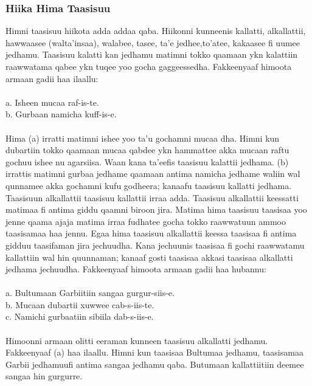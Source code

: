 \documentclass[11pt,b5paper]{book}
\begin{document}
\subsubsection{Hiika Hima Taasisuu }

Himni taasisuu hiikota adda addaa qaba. Hiikonni kunneenis kallatti, alkallattii, hawwaasee (walta’insaa), walabee, tasee, ta’e jedhee,to’atee, kakaasee fi uumee jedhamu. Taasisuu
kalatti kan jedhamu matimni tokko qaamaan ykn kalattiin raawwatama qabee ykn tuqee yoo gocha gaggeessedha. Fakkeenyaaf himoota armaan gadii haa ilaallu: \\
\\
a. Isheen mucaa raf-is-te.\\
b. Gurbaan namicha kuff-is-e.\\
\\
Hima (a) irratti matimni ishee yoo ta’u gochamni mucaa dha. Himni kun dubartiin tokko qaamaan mucaa qabdee ykn hammattee akka mucaan raftu gochuu ishee nu agarsiisa. Waan kana ta’eefis taasisuu kalattii jedhama. (b) irrattis matimni gurbaa jedhame qaamaan antima namicha jedhame waliin wal qunnamee akka gochamni kufu godheera; kanaafu taasisuu kallatti jedhama. Taasisuun alkallattii taasisuu kallattii irraa adda. Taasisuu alkallattii keessatti matimaa fi antima giddu qaamni biroon jira. Matima hima taasisuu taasisaa yoo jenne qaama ajaja matima irraa fudhatee gocha tokko raawwatuun ammoo taasisamaa haa jennu. Egaa hima taasisuu alkallattii keessa taasisaa fi antima gidduu taasifaman jira jechuudha.
Kana jechuunis taasisaa fi gochi raawwatamu kallattiin wal hin quunnaman; kanaaf gosti taasisaa akkasi taasisaa alkallatti jedhama jechuudha. Fakkeenyaaf himoota armaan gadii haa hubannu: \\
\\
a. Bultumaan Garbiitiin sangaa gurgur-siis-e.\\
b. Mucaan dubartii xuwwee cab-s-iis-te.\\
c. Namichi gurbaatiin sibiila dab-s-iis-e.\\
\\
Himoonni armaan olitti eeraman kunneen taasisuu alkallatti jedhamu. Fakkeenyaaf (a) haa ilaallu. Himni kun taasisaa Bultumaa jedhamu, taasisamaa Garbii jedhamuufi antima sangaa jedhamu qaba. Butumaan kallattiitiin deemee sangaa hin gurgurre. 
\end{document}
